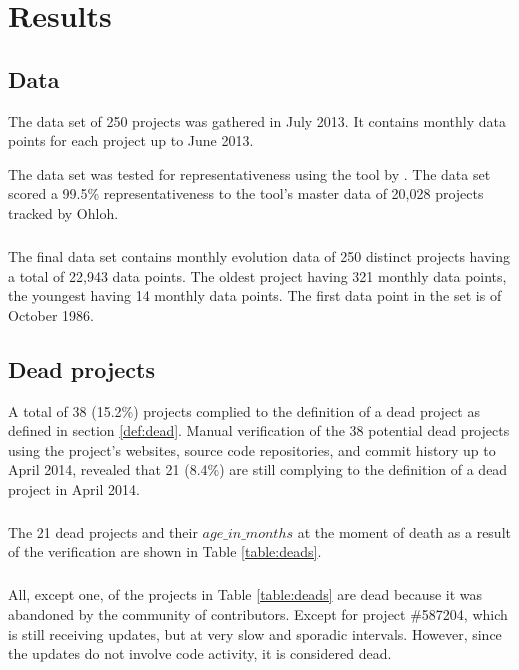 \chapter{Results}
\label{results}

\section{Data}
The data set of 250 projects was gathered in July 2013. It contains monthly
data points for each project up to June 2013.

The data set was tested for representativeness using the tool by
\citet{nagappan}. The data set scored a 99.5\% representativeness to the tool's
master data of 20,028 projects tracked by Ohloh.

\paragraph{}
The final data set contains monthly evolution data of 250 distinct projects
having a total of 22,943 data points. The oldest project having 321 monthly
data points, the youngest having 14 monthly data points. The first data point
in the set is of October 1986.

\section{Dead projects}
\label{section:deads}
A total of 38 (15.2\%) projects complied to the definition of a dead project as
defined in section \ref{def:dead}. Manual verification of the 38 potential
dead projects using the project's websites, source code repositories, and
commit history up to April 2014, revealed that 21 (8.4\%) are still complying
to the definition of a dead project in April 2014.

\paragraph{}
The 21 dead projects and their $age\_in\_months$ at the moment of death as a
result of the verification are shown in Table \ref{table:deads}.



\paragraph{}
All, except one, of the projects in Table \ref{table:deads} are dead because it
was abandoned by the community of contributors. Except for project \#587204,
which is still receiving updates, but at very slow and sporadic intervals.
However, since the updates do not involve code activity, it is considered dead.

